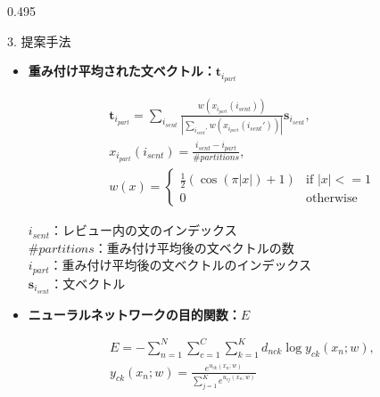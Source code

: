 \documentclass[unicode,10pt]{beamer}
\newcommand{\mycolumnwidth}{0.495\textwidth}
\newcommand{\itemtitle}[1]{\textbf{#1}\\}
\newcommand{\doublecolumns}[4]{
    \begin{minipage}[t]{#1}
      #2
    \end{minipage}
    \begin{minipage}[t]{#3}
      #4
    \end{minipage}}
\begin{document}
\begin{frame}
\begin{columns}[onlytextwidth,t]
\begin{column}{\mycolumnwidth}
\begin{block}{3. 提案手法}
    \begin{itemize}
      \item \itemtitle{重み付け平均された文ベクトル：$\mathbf{t}_{i_{part}}$}
        \doublecolumns{0.625\linewidth}{
          \abovedisplayskip=0pt
          \begin{gather*}
            \mathbf{t}_{i_{part}} = \sum_{i_{sent}}
                                    \frac{w(x_{i_{part}}(i_{sent}))}
                                         {|\sum_{i_{sent}'}
                                    w(x_{i_{part}}(i_{sent}'))|}
                                    \mathbf{s}_{i_{sent}},
            \label{eq:WeightedAverageSV} \\
            x_{i_{part}}(i_{sent}) = \frac{i_{sent} - i_{part}}{\#partitions},
            \nonumber \\
            w(x) = \begin{cases}
              \frac{1}{2} (\cos(\pi|x|) + 1) &\text{if $|x| <= 1$} \\
              0 &\text{otherwise}
            \end{cases} \nonumber
          \end{gather*}
        }{0.35\linewidth}{
          \small
          $i_{sent}$：レビュー内の文のインデックス \\
          $\#partitions$：重み付け平均後の文ベクトルの数\\
          $i_{part}$：重み付け平均後の文ベクトルのインデックス\\
          $\mathbf{s}_{i_{sent}}$：文ベクトル
        }
      \item \itemtitle{ニューラルネットワークの目的関数：$E$}
        \doublecolumns{0.6\linewidth}{
          \begin{gather*}
            E = - \sum^{N}_{n = 1} \sum^{C}_{c = 1} \sum^{K}_{k = 1}
                  d_{nck} \log{y_{ck}(x_n; w)},
            \label{eq:NNObjective} \\
            y_{ck}(x_n; w) = \frac{e^{u_{ck}(x_n; w)}}
                                  {\sum^{K}_{j = 1} e^{u_{cj}(x_n; w)}}
            \nonumber
          \end{gather*}
        }{0.375\linewidth}{
          \small
}
\end{itemize}
\end{block}
\end{column}
\end{columns}
\end{frame}
\end{document}
